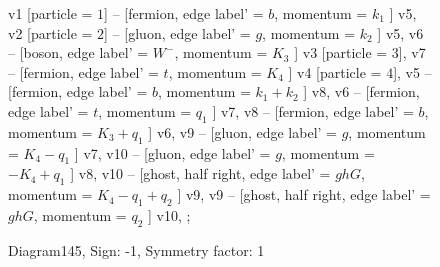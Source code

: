 \documentclass{revtex4}
\begin{document}
\begin{figure}[!htb]
\begin{center}
{    %
v1 [particle = \(1\)] -- [fermion, edge label' = \(b\), momentum = \(k_{1}\) ] v5, 
v2 [particle = \(2\)] -- [gluon, edge label' = \(g\), momentum = \(k_{2}\) ] v5, 
v6 -- [boson, edge label' = \(W^{-}\), momentum = \(K_{3}\) ] v3 [particle = \(3\)], 
v7 -- [fermion, edge label' = \(t\), momentum = \(K_{4}\) ] v4 [particle = \(4\)], 
v5 -- [fermion, edge label' = \(b\), momentum = \(k_{1} + k_{2}\) ] v8, 
v6 -- [fermion, edge label' = \(t\), momentum = \(q_{1}\) ] v7, 
v8 -- [fermion, edge label' = \(b\), momentum = \(K_{3} + q_{1}\) ] v6, 
v9 -- [gluon, edge label' = \(g\), momentum = \(K_{4} - q_{1}\) ] v7, 
v10 -- [gluon, edge label' = \(g\), momentum = \(-K_{4} + q_{1}\) ] v8, 
v10 -- [ghost, half right, edge label' = \(ghG\), momentum = \(K_{4} - q_{1} + q_{2}\) ] v9, 
v9 -- [ghost, half right, edge label' = \(ghG\), momentum = \(q_{2}\) ] v10, 
};
\end{center}
\caption{Diagram145, Sign: -1, Symmetry factor: 1}
\end{figure}
\newpage
\end{document}
